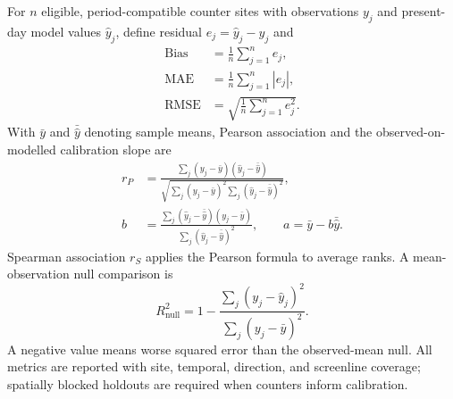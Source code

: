 For $n$ eligible, period-compatible counter sites with observations $y_j$ and
present-day model values $\widehat y_j$, define residual
$e_j=\widehat y_j-y_j$ and
\begin{align}
\operatorname{Bias}
 &=\frac1n\sum_{j=1}^{n}e_j,
\label{eq:validation-bias}\\
\operatorname{MAE}
 &=\frac1n\sum_{j=1}^{n}|e_j|,
\label{eq:validation-mae}\\
\operatorname{RMSE}
 &=\sqrt{\frac1n\sum_{j=1}^{n}e_j^2}.
\label{eq:validation-rmse}
\end{align}
With $\bar y$ and $\bar{\widehat y}$ denoting sample means, Pearson association
and the observed-on-modelled calibration slope are
\begin{align}
r_P
 &=\frac{\sum_j(y_j-\bar y)(\widehat y_j-\bar{\widehat y})}
 {\sqrt{\sum_j(y_j-\bar y)^2\sum_j(\widehat y_j-\bar{\widehat y})^2}},
\label{eq:validation-pearson}\\
b
 &=\frac{\sum_j(\widehat y_j-\bar{\widehat y})(y_j-\bar y)}
 {\sum_j(\widehat y_j-\bar{\widehat y})^2},
\qquad a=\bar y-b\bar{\widehat y}.
\label{eq:validation-calibration}
\end{align}
Spearman association $r_S$ applies the Pearson formula to average ranks. A
mean-observation null comparison is
\begin{equation}
R^2_{\mathrm{null}}
=1-\frac{\sum_j(y_j-\widehat y_j)^2}
        {\sum_j(y_j-\bar y)^2}.
\label{eq:validation-null-r2}
\end{equation}
A negative value means worse squared error than the observed-mean null. All
metrics are reported with site, temporal, direction, and screenline coverage;
spatially blocked holdouts are required when counters inform calibration.

